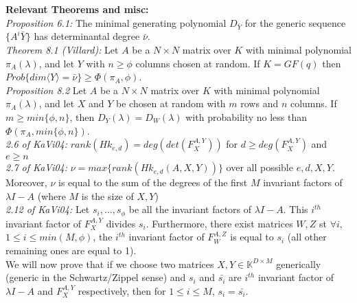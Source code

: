 \documentclass[12pt]{article}
\begin{document}
	
\noindent\textbf{Relevant Theorems and misc:}\\
\noindent\textit{Proposition 6.1:} The minimal generating polynomial $D_{\bar{Y}}$ for the generic
sequence $\{A^i\bar{Y}\}$ has determinantal degree $\bar{\nu}$.\\

\noindent\textit{Theorem 8.1 (Villard):} Let $A$ be a $N \times N$ matrix over $K$ with minimal polynomial $\pi_A(\lambda)$,
and let $Y$ with $n \ge \phi$ columns chosen at random. If $K = GF(q)$ then $Prob\{dim \langle Y \rangle = \bar{\nu} \} \ge
\Phi(\pi_A,\phi)$.\\

\noindent\textit{Proposition 8.2} Let $A$ be a $N \times N$ matrix over $K$ with minimal polynomial $\pi_A(\lambda)$,
and let $X$ and $Y$ be chosen at random with $m$ rows and $n$ columns. If $m \ge min\{\phi,n\}$, then $D_Y(\lambda) = D_W(\lambda)$
with probability no less than $\Phi(\pi_A,min\{\phi,n\})$.\\

\noindent\textit{2.6 of KaVi04:} $rank(Hk_{e,d}) = deg(det(F_X^{A,Y}))$ for $d \ge deg(F_X^{A,Y})$ and $e \ge n$\\

\noindent\textit{2.7 of KaVi04:} $\nu = max\{ rank(Hk_{e,d}(A,X,Y))\}$ over all possible $e,d,X,Y$. Moreover, $\nu$ is equal to the sum of the
degrees of the first $M$ invariant factors of $\lambda I -A$ (where $M$ is the size of $X,Y$)\\

\noindent\textit{2.12 of KaVi04:} Let $s_i,\dots, s_\phi$ be all the invariant factors of $\lambda I - A$. This $i^{th}$ invariant factor of
$F_X^{A,Y}$ divides $s_i$. Furthermore, there exist matrices $W,Z$ st $\forall i$, $1 \le i \le min(M,\phi)$, the $i^{th}$ invariant factor of
$F_W^{A,Z}$ is equal to $s_i$ (all other remaining ones are equal to 1).\\

\noindent We will now prove that if we choose two matrices $X,Y \in \mathbb{K}^{D\times M}$ generically 
(generic in the Schwartz/Zippel sense) and $s_i$ and $\bar{s_i}$ are $i^{th}$ invariant factor of 
$\lambda I - A$ and $F_X^{A,Y}$ respectively, then for $1 \le i \le M$,
$s_i = \bar{s_i}$.
\end{document}

